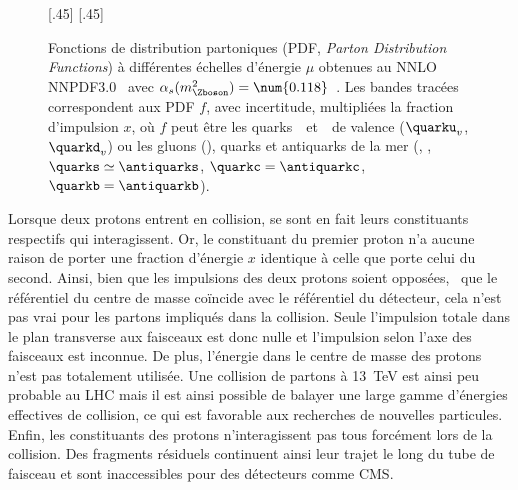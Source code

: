 \begin{figure}[t]
\centering
{}[.45\textwidth]
{}
\hfill
{}[.45\textwidth]
{}
\caption[Fonctions de distribution partoniques.]{Fonctions de distribution partoniques (PDF, \emph{Parton Distribution Functions}) à différentes échelles d'énergie $\mu$ obtenues au NNLO NNPDF3.0~\cite{NNPDF30} avec $\alpha_s(m_{\Zboson}^2)=\num{0.118}$~\cite{PDG_booklet_2020}. Les bandes tracées correspondent aux PDF $f$, avec incertitude, multipliées la fraction d'impulsion $x$, où $f$ peut être les quarks~\quarku\ et~\quarkd\ de valence ($\quarku_v$, $\quarkd_v$) ou les gluons (\gluon), quarks et antiquarks de la mer (\antiquarku, \antiquarkd, $\quarks\simeq\antiquarks$, $\quarkc=\antiquarkc$, $\quarkb=\antiquarkb$).}
\label{fig-proton_PDFs}
\end{figure}
\par Lorsque deux protons entrent en collision, se sont en fait leurs constituants respectifs qui interagissent.
Or, le constituant du premier proton n'a aucune raison de porter une fraction d'énergie $x$ identique à celle que porte celui du second.
Ainsi, bien que les impulsions des deux protons soient opposées, \ie\ que le référentiel du centre de masse
coïncide avec le référentiel du détecteur, cela n'est pas vrai pour les partons impliqués dans la collision.
Seule l'impulsion totale dans le plan transverse aux faisceaux est donc nulle et l'impulsion selon l'axe des faisceaux est inconnue.
De plus, l'énergie dans le centre de masse des protons n'est pas totalement utilisée.
Une collision de partons à \SI{13}{\TeV} est ainsi peu probable au LHC
mais
il est ainsi possible de balayer une large gamme d'énergies effectives de collision, ce qui est favorable aux recherches de nouvelles particules.
Enfin, les constituants des protons n'interagissent pas tous forcément lors de la collision.
Des fragments résiduels continuent ainsi leur trajet le long du tube de faisceau et sont inaccessibles pour des détecteurs comme CMS.

